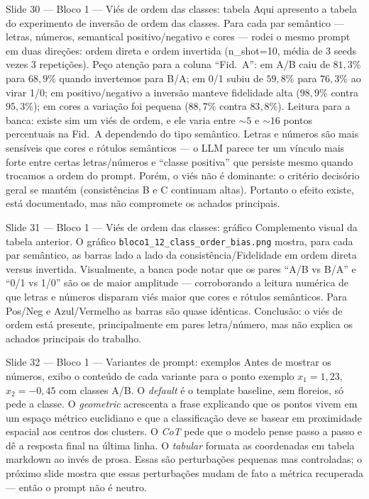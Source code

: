 \documentclass[aspectratio=169,10pt]{beamer}
\begin{document}
\begin{frame}{Slide 30 --- Bloco 1 --- Vi\'es de ordem das classes: tabela}
\footnotesize
Aqui apresento a tabela do experimento de invers\~ao de ordem das classes. Para cada par sem\^antico --- letras, n\'umeros, semantical positivo/negativo e cores --- rodei o mesmo prompt em duas dire\c{c}\~oes: ordem direta e ordem invertida (n\_shot=10, m\'edia de 3 seeds vezes 3 repeti\c{c}\~oes). Pe\c{c}o aten\c{c}\~ao para a coluna ``Fid.\ A'': em A/B caiu de $81{,}3\%$ para $68{,}9\%$ quando invertemos para B/A; em 0/1 subiu de $59{,}8\%$ para $76{,}3\%$ ao virar 1/0; em positivo/negativo a invers\~ao manteve fidelidade alta ($98{,}9\%$ contra $95{,}3\%$); em cores a varia\c{c}\~ao foi pequena ($88{,}7\%$ contra $83{,}8\%$). Leitura para a banca: existe sim um vi\'es de ordem, e ele varia entre $\sim 5$ e $\sim 16$ pontos percentuais na Fid.\ A dependendo do tipo sem\^antico. Letras e n\'umeros s\~ao mais sens\'iveis que cores e r\'otulos sem\^anticos --- o LLM parece ter um v\'inculo mais forte entre certas letras/n\'umeros e ``classe positiva'' que persiste mesmo quando trocamos a ordem do prompt. Por\'em, o vi\'es n\~ao \'e dominante: o critério decis\'orio geral se mant\'em (consist\^encias B e C continuam altas). Portanto o efeito existe, est\'a documentado, mas n\~ao compromete os achados principais.
\end{frame}

\begin{frame}{Slide 31 --- Bloco 1 --- Vi\'es de ordem das classes: gr\'afico}
\footnotesize
Complemento visual da tabela anterior. O gr\'afico \texttt{bloco1\_12\_class\_order\_bias.png} mostra, para cada par sem\^antico, as barras lado a lado da consist\^encia/Fidelidade em ordem direta versus invertida. Visualmente, a banca pode notar que os pares ``A/B vs B/A'' e ``0/1 vs 1/0'' s\~ao os de maior amplitude --- corroborando a leitura num\'erica de que letras e n\'umeros disparam vi\'es maior que cores e r\'otulos sem\^anticos. Para Pos/Neg e Azul/Vermelho as barras s\~ao quase id\^enticas. Conclus\~ao: o vi\'es de ordem est\'a presente, principalmente em pares letra/n\'umero, mas n\~ao explica os achados principais do trabalho.
\end{frame}

\begin{frame}{Slide 32 --- Bloco 1 --- Variantes de prompt: exemplos}
\footnotesize
Antes de mostrar os n\'umeros, exibo o conte\'udo de cada variante para o ponto exemplo $x_1=1{,}23$, $x_2=-0{,}45$ com classes A/B. O \emph{default} \'e o template baseline, sem floreios, s\'o pede a classe. O \emph{geometric} acrescenta a frase explicando que os pontos vivem em um espa\c{c}o m\'etrico euclidiano e que a classifica\c{c}\~ao deve se basear em proximidade espacial aos centros dos clusters. O \emph{CoT} pede que o modelo pense passo a passo e d\^e a resposta final na \'ultima linha. O \emph{tabular} formata as coordenadas em tabela markdown ao inv\'es de prosa. Essas s\~ao perturba\c{c}\~oes pequenas mas controladas; o pr\'oximo slide mostra que essas perturba\c{c}\~oes mudam de fato a m\'etrica recuperada --- ent\~ao o prompt n\~ao \'e neutro.
\end{frame}
\end{document}
